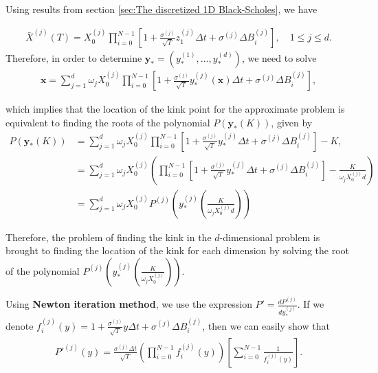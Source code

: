 Using results from section \ref{sec:The discretized 1D Black-Scholes}, we have

\begin{align}
	\bar{X}^{(j)}(T)=X_0^{(j)} \prod_{i=0}^{N-1} \left[ 1+\frac{\sigma^{(j)}}{\sqrt{T}} z^{(j)}_1 \Delta t+ \sigma^{(j)} \Delta B^{(j)}_{i}\right], \quad 1 \le j \le d.
\end{align}
Therefore, in order to determine $\mathbf{y}_{\ast}=(y_{\ast}^{(1)},\dots,y_{\ast}^{(d)})$, we need to solve
\begin{align}
	\mathbf{x}=\sum_{j=1}^{d} \omega_j X^{(j)}_0 \prod_{i=0}^{N-1} \left[ 1+\frac{\sigma^{(j)}}{\sqrt{T}} y^{(j)}_{\ast}(\mathbf{x}) \Delta t+ \sigma^{(j)} \Delta B^{(j)}_{i}\right],
\end{align}

which implies that the location of the kink point for the approximate problem is equivalent to finding the roots of the polynomial $P(\mathbf{y}_\ast(K))$, given by
\begin{align}\label{polynomial_kink_location_basket}
	P(\mathbf{y}_{\ast}(K))&=\sum_{j=1}^{d} \omega_j X^{(j)}_0 \prod_{i=0}^{N-1} \left[ 1+\frac{\sigma^{(j)}}{\sqrt{T}} y^{(j)}_{\ast} \Delta t+ \sigma^{(j)} \Delta B^{(j)}_{i}\right]-K, \nonumber\\
	&=\sum_{j=1}^{d} \omega_j X^{(j)}_0 \left(\prod_{i=0}^{N-1} \left[ 1+\frac{\sigma^{(j)}}{\sqrt{T}} y_\ast^{(j)} \Delta t+ \sigma^{(j)} \Delta B^{(j)}_{i}\right]-\frac{K}{ \omega_j X^{(j)}_0  d}\right) \nonumber\\
	&=\sum_{j=1}^{d} \omega_j X^{(j)}_0 P^{(j)}\left(y_\ast^{(j)}\left(\frac{K}{ \omega_j X^{(j)}_0  d }\right)\right)
\end{align}

Therefore, the problem of finding the kink in the $d$-dimensional problem is brought to finding the location of the kink for each dimension by solving the root of the polynomial $P^{(j)}\left(y_\ast^{(j)}\left(\frac{K}{\omega_j X^{(j)}_0 }\right)\right)$.  

Using  \textbf{Newton iteration method}, we use the expression $P'=\frac{d P^{(j)}}{d y_\ast^{(j)}}$. If we denote $f_i^{(j)}(y)=1+\frac{\sigma^{(j)}}{\sqrt{T}} y \Delta t+ \sigma^{(j)} \Delta B^{(j)}_{i}$, then we can easily show that
\begin{align}\label{polynomial_kink_location_derivative_basket}
	P'^{(j)}(y)=\frac{\sigma^{(j)} \Delta t}{\sqrt{T}} \left( \prod_{i=0}^{N-1} f_i^{(j)}(y)\right) \left[ \sum_{i=0}^{N-1} \frac{1}{f_i^{(j)}(y)}\right].
\end{align}




